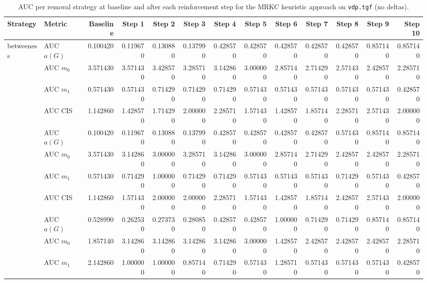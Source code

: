 \begin{table}[htbp]
  \centering
  \caption{AUC per removal strategy at baseline and after each reinforcement step for the MRKC heuristic approach on \texttt{vdp.tgf} (no deltas).}
  \label{tab:vdp-mrkc_heuristic-auc}
\setlength{\tabcolsep}{2.5pt}
  \begin{tabular}{llrrrrrrrrrrr}
    \toprule
    \textbf{Strategy} & \textbf{Metric} & \textbf{Baseline} & \textbf{Step 1} & \textbf{Step 2} & \textbf{Step 3} & \textbf{Step 4} & \textbf{Step 5} & \textbf{Step 6} & \textbf{Step 7} & \textbf{Step 8} & \textbf{Step 9} & \textbf{Step 10} \\
    \midrule
    \multirow{4}{*}{betweeness} & AUC $a(G)$ & 0.100420 & 0.119670 & 0.130880 & 0.137990 & 0.428570 & 0.428570 & 0.428570 & 0.428570 & 0.428570 & 0.857140 & 0.857140 \\
    & AUC $m_0$ & 3.571430 & 3.571430 & 3.428570 & 3.285710 & 3.142860 & 3.000000 & 2.857140 & 2.714290 & 2.571430 & 2.428570 & 2.285710 \\
    & AUC $m_1$ & 0.571430 & 0.571430 & 0.714290 & 0.714290 & 0.714290 & 0.571430 & 0.571430 & 0.571430 & 0.571430 & 0.571430 & 0.428570 \\
    & AUC CIS & 1.142860 & 1.428570 & 1.714290 & 2.000000 & 2.285710 & 1.571430 & 1.428570 & 1.857140 & 2.285710 & 2.571430 & 2.000000 \\
    \addlinespace
    \multirow{4}{*}{closeness} & AUC $a(G)$ & 0.100420 & 0.119670 & 0.130880 & 0.137990 & 0.428570 & 0.428570 & 0.428570 & 0.428570 & 0.571430 & 0.857140 & 0.857140 \\
    & AUC $m_0$ & 3.571430 & 3.142860 & 3.000000 & 3.285710 & 3.142860 & 3.000000 & 2.857140 & 2.714290 & 2.428570 & 2.428570 & 2.285710 \\
    & AUC $m_1$ & 0.571430 & 0.714290 & 1.000000 & 0.714290 & 0.714290 & 0.571430 & 0.571430 & 0.571430 & 0.714290 & 0.571430 & 0.428570 \\
    & AUC CIS & 1.142860 & 1.571430 & 2.000000 & 2.000000 & 2.285710 & 1.571430 & 1.428570 & 1.857140 & 2.428570 & 2.571430 & 2.000000 \\
    \addlinespace
    \multirow{4}{*}{core influence} & AUC $a(G)$ & 0.528990 & 0.262530 & 0.273730 & 0.280850 & 0.428570 & 0.428570 & 1.000000 & 0.714290 & 0.714290 & 0.857140 & 0.857140 \\
    & AUC $m_0$ & 1.857140 & 3.142860 & 3.142860 & 3.142860 & 3.142860 & 3.000000 & 1.428570 & 2.428570 & 2.428570 & 2.428570 & 2.285710 \\
    & AUC $m_1$ & 2.142860 & 1.000000 & 1.000000 & 0.857140 & 0.714290 & 0.571430 & 1.285710 & 0.571430 & 0.571430 & 0.571430 & 0.428570 \\

\end{tabular}
\end{table}

